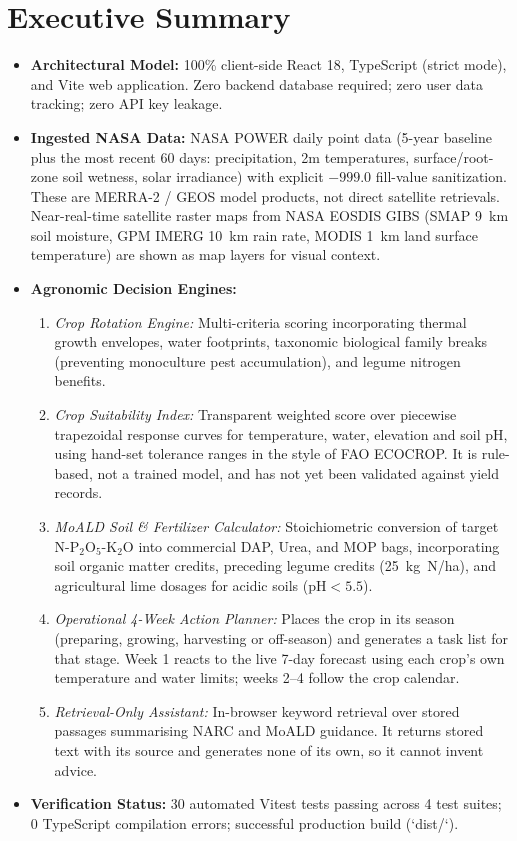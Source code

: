 \documentclass[11pt,a4paper]{report}
\begin{document}
\chapter*{Executive Summary}
\begin{itemize}
  \item \textbf{Architectural Model:} 100\% client-side React 18, TypeScript (strict mode), and Vite web application. Zero backend database required; zero user data tracking; zero API key leakage.
  \item \textbf{Ingested NASA Data:} NASA POWER daily point data (5-year baseline plus the most recent 60 days: precipitation, 2m temperatures, surface/root-zone soil wetness, solar irradiance) with explicit $-999.0$ fill-value sanitization. These are MERRA-2 / GEOS model products, not direct satellite retrievals. Near-real-time satellite raster maps from NASA EOSDIS GIBS (SMAP 9~km soil moisture, GPM IMERG 10~km rain rate, MODIS 1~km land surface temperature) are shown as map layers for visual context.
  \item \textbf{Agronomic Decision Engines:}
  \begin{enumerate}
    \item \textit{Crop Rotation Engine:} Multi-criteria scoring incorporating thermal growth envelopes, water footprints, taxonomic biological family breaks (preventing monoculture pest accumulation), and legume nitrogen benefits.
    \item \textit{Crop Suitability Index:} Transparent weighted score over piecewise trapezoidal response curves for temperature, water, elevation and soil pH, using hand-set tolerance ranges in the style of FAO ECOCROP. It is rule-based, not a trained model, and has not yet been validated against yield records.
    \item \textit{MoALD Soil \& Fertilizer Calculator:} Stoichiometric conversion of target N-P$_2$O$_5$-K$_2$O into commercial DAP, Urea, and MOP bags, incorporating soil organic matter credits, preceding legume credits (25~kg~N/ha), and agricultural lime dosages for acidic soils ($\text{pH} < 5.5$).
    \item \textit{Operational 4-Week Action Planner:} Places the crop in its season (preparing, growing, harvesting or off-season) and generates a task list for that stage. Week 1 reacts to the live 7-day forecast using each crop's own temperature and water limits; weeks 2--4 follow the crop calendar.
    \item \textit{Retrieval-Only Assistant:} In-browser keyword retrieval over stored passages summarising NARC and MoALD guidance. It returns stored text with its source and generates none of its own, so it cannot invent advice.
  \end{enumerate}
  \item \textbf{Verification Status:} 30 automated Vitest tests passing across 4 test suites; 0 TypeScript compilation errors; successful production build (`dist/`).
\end{itemize}
\end{document}
